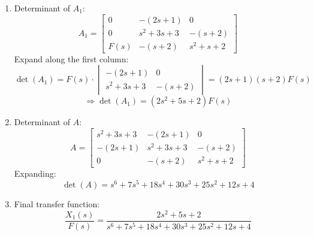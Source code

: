 \documentclass[11pt]{article}
\begin{document}
\begin{enumerate}[label=(\alph*), itemindent=*, leftmargin=*, nolistsep]
\item Determinant of $A_1$:
\[
A_1 =
\begin{bmatrix}
0 & -(2s+1) & 0 \\
0 & s^2+3s+3 & -(s+2) \\
F(s) & -(s+2) & s^2+s+2
\end{bmatrix}
\]
Expand along the first column:
\[
\det(A_1) = F(s)\cdot
\begin{vmatrix}
-(2s+1) & 0 \\
s^2+3s+3 & -(s+2)
\end{vmatrix}
= (2s+1)(s+2)F(s)
\]
\[
\Rightarrow \det(A_1) = (2s^2+5s+2)F(s)
\]

\item Determinant of $A$:
\[
A =
\begin{bmatrix}
s^2 + 3s + 3 & -(2s+1) & 0 \\
-(2s+1) & s^2 + 3s + 3 & -(s+2) \\
0 & -(s+2) & s^2+s+2
\end{bmatrix}
\]
Expanding:
\[
\det(A) = s^6 + 7s^5 + 18s^4 + 30s^3 + 25s^2 + 12s + 4
\]

\item Final transfer function:
\[
\boxed{\frac{X_1(s)}{F(s)} = \frac{2s^2+5s+2}{s^6+7s^5+18s^4+30s^3+25s^2+12s+4}}
\]

    
\end{enumerate}

\end{document}

